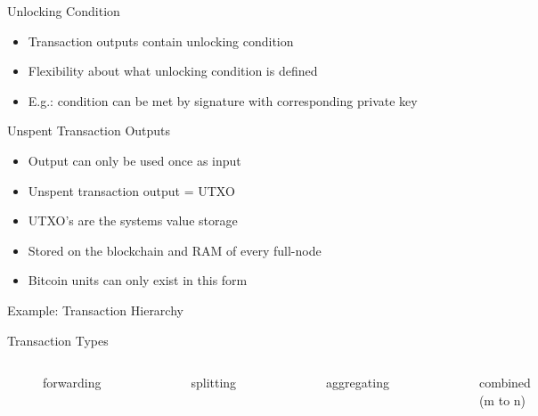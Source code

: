 \documentclass[]{beamer}
\begin{document}
\begin{frame}{Unlocking Condition}
\begin{itemize}
    \item<1->{Transaction outputs contain unlocking condition}
    \item<2->{Flexibility about what unlocking condition is defined}
    \item<3->{E.g.: condition can be met by signature with corresponding private key}
\end{itemize}
\end{frame}        


\begin{frame}{Unspent Transaction Outputs}
\begin{itemize}
    \item<1->{Output can only be used once as input}
    \item<2->{Unspent transaction output = UTXO}
    \item<3->{UTXO's are the systems value storage}
    \item<4->{Stored on the blockchain and RAM of every full-node}
    \item<5->{Bitcoin units can only exist in this form}
\end{itemize}    
\end{frame}


\begin{frame}{Example: Transaction Hierarchy}
\resizebox{10.7cm}{7cm}{

}
\end{frame}


\begin{frame}{Transaction Types}
\begin{columns}

	\vspace{1cm}
	\begin{figure}
		
		\vspace{2.5em}
		\caption*{forwarding}
	\end{figure} 
	\vspace{0.4cm}
	\begin{figure}
		
		\caption*{splitting}
	\end{figure}
	\begin{figure}
		
		\caption*{aggregating}
	\end{figure}
	\vspace{0.5cm}
	\begin{figure}
		
		\caption*{combined (m to n)}
	\end{figure}
	
\end{columns}
\end{frame}
\end{document}
